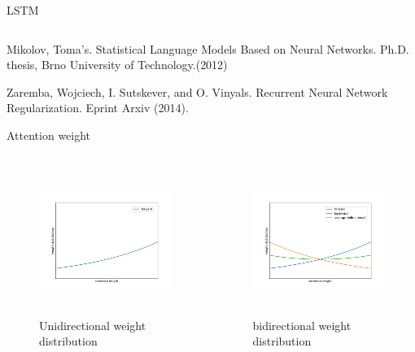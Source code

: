 \documentclass[aspectratio=169]{beamer}
\begin{document}
\begin{frame}{LSTM}
\begin{columns}
      \end{columns}
      \vspace*{2em}

      \tiny
      Mikolov, Toma's. Statistical Language Models Based on Neural Networks. Ph.D. thesis, Brno University of Technology.(2012)

      Zaremba, Wojciech, I. Sutskever, and O. Vinyals. Recurrent Neural Network Regularization. Eprint Arxiv (2014).
    \end{frame}

    \begin{frame}{Attention weight}
      \begin{columns}
      \begin{column}[t]{0.5\textwidth}
        \begin{figure}
        \includegraphics[width=6.4cm,height=4.8cm]{forward.png}
        \caption{Unidirectional weight distribution}
        \end{figure}
      \end{column}

      \begin{column}[t]{0.5\textwidth}
        \begin{figure}
        \includegraphics[width=6.4cm,height=4.8cm]{bidirectional.png}
        \caption{bidirectional weight distribution}
        \end{figure}
      \end{column}

      \end{columns}
    \end{frame}
\end{document}
